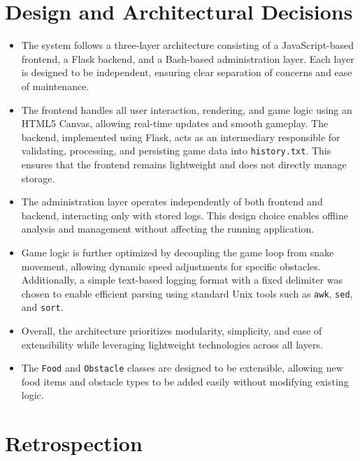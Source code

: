 \documentclass{article}
\begin{document}
\section{Design and Architectural Decisions}
\begin{itemize}
    \item The system follows a three-layer architecture consisting of a JavaScript-based frontend, a Flask backend, and a Bash-based administration layer. Each layer is designed to be independent, ensuring clear separation of concerns and ease of maintenance.

\item The frontend handles all user interaction, rendering, and game logic using an HTML5 Canvas, allowing real-time updates and smooth gameplay. The backend, implemented using Flask, acts as an intermediary responsible for validating, processing, and persisting game data into \texttt{history.txt}. This ensures that the frontend remains lightweight and does not directly manage storage.

\item The administration layer operates independently of both frontend and backend, interacting only with stored logs. This design choice enables offline analysis and management without affecting the running application.

\item Game logic is further optimized by decoupling the game loop from snake movement, allowing dynamic speed adjustments for specific obstacles. Additionally, a simple text-based logging format with a fixed delimiter was chosen to enable efficient parsing using standard Unix tools such as \texttt{awk}, \texttt{sed}, and \texttt{sort}.

\item Overall, the architecture prioritizes modularity, simplicity, and ease of extensibility while leveraging lightweight technologies across all layers.
\item The \texttt{Food} and \texttt{Obstacle} classes are designed to be extensible, allowing new food items and obstacle types to be added easily without modifying existing logic.
\end{itemize}
\section{Retrospection}
\end{document}
